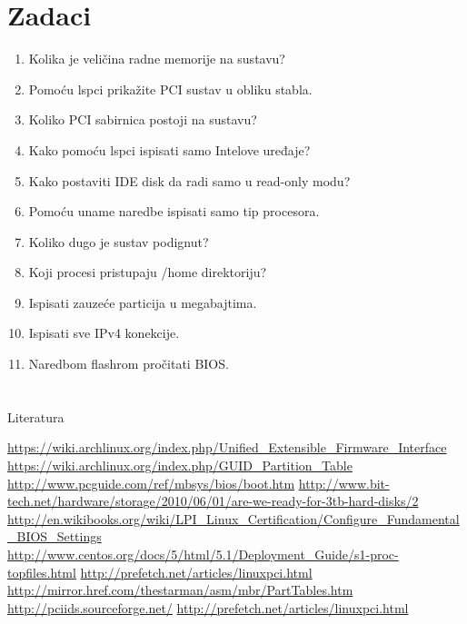 \documentclass[croatian,t]{beamer} %
\begin{document}
	\section{Zadaci}
	\begin{frame}
		\begin{enumerate}
		\item Kolika je veličina radne memorije na sustavu?
		\item Pomoću lspci prikažite PCI sustav u obliku stabla.
		\item Koliko PCI sabirnica postoji na sustavu?
		\item Kako pomoću lspci ispisati samo Intelove uređaje?	
		\item Kako postaviti IDE disk da radi samo u read-only modu?
		\item Pomoću uname naredbe ispisati samo tip procesora.
		\item Koliko dugo je sustav podignut?
		\item Koji procesi pristupaju /home direktoriju?
		\item Ispisati zauzeće particija u megabajtima.
		\item Ispisati sve IPv4 konekcije.
		\item Naredbom flashrom pročitati BIOS.
		\end{enumerate}
	\end{frame}	
	
	\section{}
	\begin{frame}{Literatura}
		\begin{tiny}
			\url{https://wiki.archlinux.org/index.php/Unified_Extensible_Firmware_Interface} \\
			\url{https://wiki.archlinux.org/index.php/GUID_Partition_Table} \\
			\url{http://www.pcguide.com/ref/mbsys/bios/boot.htm}
			\url{http://www.bit-tech.net/hardware/storage/2010/06/01/are-we-ready-for-3tb-hard-disks/2}	\url{http://en.wikibooks.org/wiki/LPI_Linux_Certification/Configure_Fundamental_BIOS_Settings}
			\url{http://www.centos.org/docs/5/html/5.1/Deployment_Guide/s1-proc-topfiles.html}
			\url{http://prefetch.net/articles/linuxpci.html}
			\url{http://mirror.href.com/thestarman/asm/mbr/PartTables.htm}
			\url{http://pciids.sourceforge.net/}
			\url{http://prefetch.net/articles/linuxpci.html}
		\end{tiny}
	\end{frame}
\end{document}
